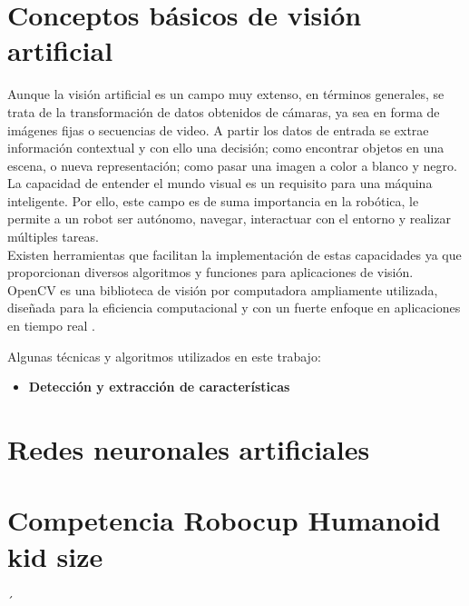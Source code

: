 \section{Conceptos básicos de visión artificial} 
Aunque la visión artificial es un campo muy extenso, en términos generales, se trata de la transformación de datos obtenidos de cámaras, ya sea en forma de imágenes fijas o secuencias de video. A partir los datos de entrada se extrae información contextual y con ello una decisión; como encontrar objetos en una escena, o nueva representación; como pasar una imagen a color a blanco y negro. La capacidad de entender el mundo visual es un requisito para una máquina inteligente. \cite{bradski2008learning} Por ello, este campo es de suma importancia en la robótica, le permite a un robot ser autónomo, navegar, interactuar con el entorno y realizar múltiples tareas. \\Existen herramientas que facilitan la implementación de estas capacidades ya que proporcionan diversos algoritmos y funciones para aplicaciones de visión.\\
OpenCV es una biblioteca de visión por computadora ampliamente utilizada, diseñada para la eficiencia computacional y con un fuerte enfoque en aplicaciones en tiempo real \cite{bradski2008learning}. 

Algunas técnicas y algoritmos utilizados en este trabajo:

\begin{itemize}
	\item \textbf{Detección y extracción de características}
\end{itemize}

\section{Redes neuronales artificiales}
    
\section{Competencia Robocup Humanoid kid size}
  ´